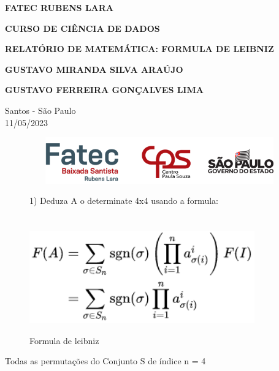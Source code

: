 \documentclass[a4paper,12pt]{article}
\begin{document}
\begin{center}
\textbf{FATEC RUBENS LARA}

\textbf{CURSO DE CIÊNCIA DE DADOS}

\vspace{3cm}

\textbf{RELATÓRIO DE MATEMÁTICA: FORMULA DE LEIBNIZ}

\vspace{3cm}

\textbf{GUSTAVO MIRANDA SILVA ARAÚJO}

\textbf{GUSTAVO FERREIRA GONÇALVES LIMA}

\vfill

\begin{flushright}
Santos - São Paulo\\
11/05/2023
\end{flushright}
\end{center}

\begin{figure}{}
\centering
\label{}
\includegraphics[width=14cm,height=2cm]{rodap-4.png}
\end{figure}

\clearpage



\begin{figure}
1) Deduza A o determinate 4x4 usando a formula:\\\\\\
    \centering
    \includegraphics[height=4cm]{leibniz.png}
    \caption{Formula de leibniz}
    \label{fig:my_label}
\end{figure}

Todas as permutações do Conjunto S de índice n = 4
\end{document}

